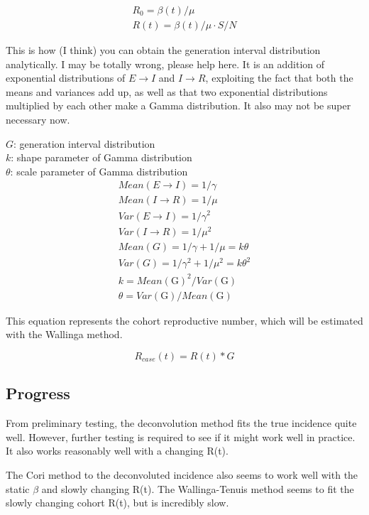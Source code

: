 \documentclass{article}
\begin{document}
\begin{align}
    R_0 = \beta(t)/\mu \\
    R(t) = \beta(t)/\mu \cdot S/N
\end{align}

This is how (I think) you can obtain the generation interval distribution analytically. I may be totally wrong, please help here. It is an addition of exponential distributions of $E \xrightarrow{}I$ and $I \xrightarrow{} R$, exploiting the fact that both the means and variances add up, as well as that two exponential distributions multiplied by each other make a Gamma distribution. It also may not be super necessary now.


$G$: generation interval distribution \\ 
$k$: shape parameter of Gamma distribution\\
$\theta$: scale parameter of Gamma distribution\\

\begin{align}
    Mean(E \xrightarrow{}I) = 1/\gamma \\ 
    Mean(I \xrightarrow{}R) = 1/\mu \\ 
    Var(E \xrightarrow{}I) = 1/\gamma^2 \\ 
    Var(I \xrightarrow{}R) = 1/\mu^2 \\
    Mean(G) = 1/\gamma + 1/\mu = k\theta\\ 
    Var(G) = 1/\gamma^2 + 1/\mu^2 = k\theta^2 \\ 
    k =  Mean(\text{G})^2/Var(\text{G}) \\
    \theta = Var(\text{G})/Mean(\text{G})
\end{align}

This equation represents the cohort reproductive number, which will be estimated with the Wallinga method.

\begin{equation}
    R_{case}(t) = R(t) * G
\end{equation}

\subsection{Progress}
From preliminary testing, the deconvolution method fits the true incidence quite well. However, further testing is required to see if it might work well in practice. It also works reasonably well with a changing R(t). 

The Cori method to the deconvoluted incidence also seems to work well with the static $\beta$ and slowly changing R(t). The Wallinga-Tenuis method seems to fit the slowly changing cohort R(t), but is incredibly slow.
\end{document}
